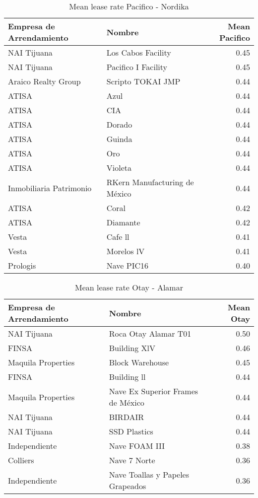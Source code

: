 \documentclass[]{article}
\begin{document}
\begin{table}[ht]
\centering
\caption{Mean lease rate Pacifico - Nordika} 
\begingroup\fontsize{7pt}{10pt}\selectfont
\begin{tabular}{llr}
  \hline
Empresa de Arrendamiento & Nombre & Mean Pacifico \\ 
  \hline
NAI Tijuana & Los Cabos Facility & 0.45 \\ 
  NAI Tijuana & Pacifico I Facility & 0.45 \\ 
  Araico Realty Group & Scripto TOKAI JMP & 0.44 \\ 
  ATISA & Azul & 0.44 \\ 
  ATISA & CIA & 0.44 \\ 
  ATISA & Dorado & 0.44 \\ 
  ATISA & Guinda & 0.44 \\ 
  ATISA & Oro & 0.44 \\ 
  ATISA & Violeta & 0.44 \\ 
  Inmobiliaria Patrimonio & RKern Manufacturing de México & 0.44 \\ 
  ATISA & Coral & 0.42 \\ 
  ATISA & Diamante & 0.42 \\ 
  Vesta & Cafe ll & 0.41 \\ 
  Vesta & Morelos lV & 0.41 \\ 
  Prologis & Nave PIC16 & 0.40 \\ 
   \hline
\end{tabular}
\endgroup
\end{table}

\begin{table}[ht]
\centering
\caption{Mean lease rate Otay - Alamar} 
\begingroup\fontsize{7pt}{10pt}\selectfont
\begin{tabular}{llr}
  \hline
Empresa de Arrendamiento & Nombre & Mean Otay \\ 
  \hline
NAI Tijuana & Roca Otay Alamar T01 & 0.50 \\ 
  FINSA & Building XlV & 0.46 \\ 
  Maquila Properties & Block Warehouse & 0.45 \\ 
  FINSA & Building ll & 0.44 \\ 
  Maquila Properties & Nave Ex Superior Frames de México & 0.44 \\ 
  NAI Tijuana & BIRDAIR & 0.44 \\ 
  NAI Tijuana & SSD Plastics & 0.44 \\ 
  Independiente & Nave FOAM III & 0.38 \\ 
  Colliers & Nave 7 Norte & 0.36 \\ 
  Independiente & Nave Toallas y Papeles Grapeados & 0.36 \\ 
   \hline
\end{tabular}
\endgroup
\end{table}
\end{document}
